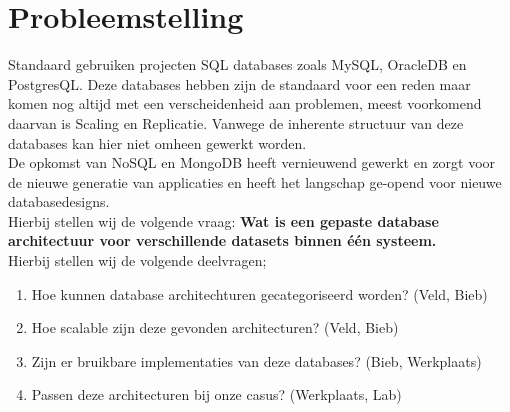 \chapter{Probleemstelling}

Standaard gebruiken projecten SQL databases zoals MySQL, OracleDB en PostgresQL. Deze databases hebben zijn de standaard voor een reden maar komen nog altijd met een verscheidenheid aan problemen, meest voorkomend daarvan is Scaling en Replicatie. Vanwege de inherente structuur van deze databases kan hier niet omheen gewerkt worden. \cite{zdnet-nosql} \\

De opkomst van NoSQL en MongoDB heeft vernieuwend gewerkt en zorgt voor de nieuwe generatie van applicaties en heeft het langschap ge-opend voor nieuwe databasedesigns. \\

Hierbij stellen wij de volgende vraag: \textbf{Wat is een gepaste database architectuur voor verschillende datasets binnen \'e\'en systeem.} \\

Hierbij stellen wij de volgende deelvragen;

\begin{enumerate}
	\item Hoe kunnen database architechturen gecategoriseerd worden? (Veld, Bieb)
	\item Hoe scalable zijn deze gevonden architecturen? (Veld, Bieb)
	\item Zijn er bruikbare implementaties van deze databases? (Bieb, Werkplaats)
	\item Passen deze architecturen bij onze casus? (Werkplaats, Lab)
\end{enumerate}